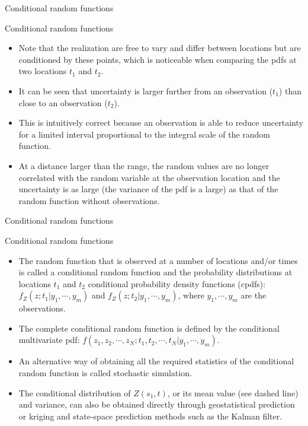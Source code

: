 \documentclass[8pt]{beamer}
\renewcommand{\emph}[1]{\textcolor{myorange}{#1}}
\begin{document}
 \begin{frame}{Conditional random functions}
     \begin{block}{Conditional random functions}
    \end{block}
    \begin{itemize}
        \item Note that the realization are free to vary and differ between locations but are \emph{conditioned} by these points, which is noticeable when comparing the \emph{pdf}s at two locations $t_1$ and $t_2$. 
        \item It can be seen that uncertainty is larger further from an observation ($t_1$) than close to an observation ($t_2$).
        \item This is intuitively correct because an observation is able to reduce uncertainty for a limited interval proportional to the integral scale of the random function. 
\item At a distance larger than the range, the random values are no longer correlated with the random variable at the observation location and the uncertainty is as large (the variance of the pdf is a large) as that of the random function without observations.
   \end{itemize}
    \end{frame}

 \begin{frame}{Conditional random functions}
     \begin{block}{Conditional random functions}
    \end{block}
    \begin{itemize}
 \item The random function that is observed at a number of locations and/or times is called a \emph{conditional random function} and the probability distributions at locations $t_1$ and $t_2$ \emph{conditional probability density functions (cpdfs)}: $f_Z \left(z;t_1 | y_1, \cdots, y_m \right)$ and $f_Z \left(z;t_2 | y_1, \cdots, y_m\right) $, where $y_1, \cdots, y_m$ are the observations. 
\item The complete conditional random function is defined by the \emph{conditional multivariate pdf}: $f \left(z_1, z_2, \cdots, z_N ;t_1, t_2, \cdots, t_N | y_1, \cdots, y_m \right)$.
\item An alternative way of obtaining all the required statistics of the \emph{conditional random function} is called \alert{stochastic simulation}.
\item The \emph{conditional distribution} of $Z(s_1,t)$, or its \emph{mean} value (see dashed line) and \emph{variance}, can also be obtained directly through \emph{geostatistical prediction} or \emph{kriging}  and \emph{state-space prediction methods} such as the \emph{Kalman filter}.
 
    \end{itemize}
    \end{frame}
\end{document}
